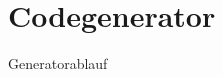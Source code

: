 \section{Codegenerator}
\begin{frame}
    \begin{example}
        \blindtext
    \end{example}
\end{frame}

\begin{frame}{Generatorablauf}
    \centering
    \resizebox{!}{0.85\textheight}{
        
    }
    \label{fig:flow}
\end{frame}